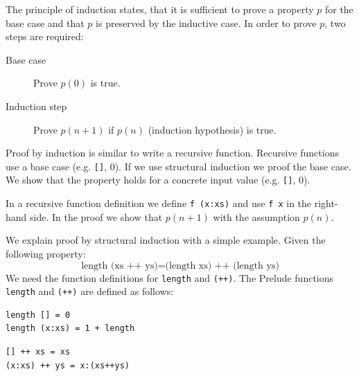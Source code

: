  The principle of induction states, that it is sufficient to prove a property $p$ for the base case and that $p$ is preserved by the inductive case. In order to prove $p$, two steps are required:
 \begin{description}
 \item[Base case] Prove $p(0)$ is true.
 \item[Induction step] Prove $p(n+1)$ if $p(n)$ (induction hypothesis) is true.
 \end{description}

Proof by induction is similar to write a recursive function. Recursive functions use a base case (e.g. \verb|[]|, 0). 
If we use structural induction we proof the base case. We show that the property holds for a concrete input value (e.g. \verb|[]|, 0). 

In a recursive function definition we define \verb|f (x:xs)| and use \verb|f x| in the right-hand side. In the proof we show that $p(n+1)$ with the assumption $p(n)$.

We explain proof by structural induction with a simple example. Given the following property:
\begin{equation}
  \label{eq:lengthprop}
  \text{length (xs ++ ys)} = \text{(length xs) ++ (length ys)}
\end{equation}
We need the function definitions for \verb|length| and \verb|(++)|.
The Prelude functions \verb|length| and \verb|(++)| are defined as follows:
\begin{verbatim}
length [] = 0
length (x:xs) = 1 + length 
\end{verbatim}

\begin{verbatim}
[] ++ xs = xs
(x:xs) ++ ys = x:(xs++ys)
\end{verbatim}


